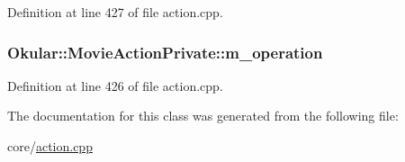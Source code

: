 Definition at line 427 of file action.\+cpp.

\hypertarget{classOkular_1_1MovieActionPrivate_abe2655c9684cbe5f61cf7294bad5f0bf}{
\subsubsection[{m\+\_\+operation}]{ Okular\+::\+Movie\+Action\+Private\+::m\+\_\+operation}}\label{classOkular_1_1MovieActionPrivate_abe2655c9684cbe5f61cf7294bad5f0bf}


Definition at line 426 of file action.\+cpp.



The documentation for this class was generated from the following file\+:\begin{DoxyCompactItemize}
\item 
core/\hyperlink{action_8cpp}{action.\+cpp}\end{DoxyCompactItemize}
